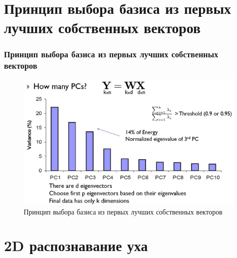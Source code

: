 \documentclass{beamer}
\begin{document}
\section{Принцип выбора базиса из первых лучших собственных векторов}

\begin{frame}
\frametitle{Принцип выбора базиса из первых лучших собственных векторов}

\begin{figure}[h!]
\centering
\includegraphics[scale=0.50]{res/pick_bases}
\caption{Принцип выбора базиса из первых лучших собственных векторов}
\end{figure}

\end{frame}

\section{2D распознавание уха}
\end{document}
